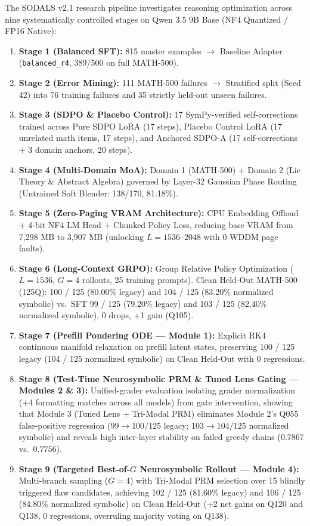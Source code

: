 \documentclass[11pt,a4paper]{article}
\begin{document}
The SODALS v2.1 research pipeline investigates reasoning optimization across nine systematically controlled stages on Qwen 3.5 9B Base (NF4 Quantized / FP16 Native):
\begin{enumerate}
    \item \textbf{Stage 1 (Balanced SFT):} 815 master examples $\to$ Baseline Adapter (\texttt{balanced\_r4}, 389/500 on full MATH-500).
    \item \textbf{Stage 2 (Error Mining):} 111 MATH-500 failures $\to$ Stratified split (Seed 42) into 76 training failures and 35 strictly held-out unseen failures.
    \item \textbf{Stage 3 (SDPO \& Placebo Control):} 17 SymPy-verified self-corrections trained across Pure SDPO LoRA (17 steps), Placebo Control LoRA (17 unrelated math items, 17 steps), and Anchored SDPO-A (17 self-corrections + 3 domain anchors, 20 steps).
    \item \textbf{Stage 4 (Multi-Domain MoA):} Domain 1 (MATH-500) + Domain 2 (Lie Theory \& Abstract Algebra) governed by Layer-32 Gaussian Phase Routing (Untrained Soft Blender: 138/170, 81.18\%).
    \item \textbf{Stage 5 (Zero-Paging VRAM Architecture):} CPU Embedding Offload + 4-bit NF4 LM Head + Chunked Policy Loss, reducing base VRAM from 7,298 MB to 3,907 MB (unlocking $L=1536\text{--}2048$ with 0 WDDM page faults).
    \item \textbf{Stage 6 (Long-Context GRPO):} Group Relative Policy Optimization ($L=1536$, $G=4$ rollouts, 25 training prompts). Clean Held-Out MATH-500 (125Q): 100 / 125 (80.00\% legacy) and 104 / 125 (83.20\% normalized symbolic) vs.\ SFT 99 / 125 (79.20\% legacy) and 103 / 125 (82.40\% normalized symbolic), 0 drops, +1 gain (Q105).
    \item \textbf{Stage 7 (Prefill Pondering ODE --- Module 1):} Explicit RK4 continuous manifold relaxation on prefill latent states, preserving 100 / 125 legacy (104 / 125 normalized symbolic) on Clean Held-Out with 0 regressions.
    \item \textbf{Stage 8 (Test-Time Neurosymbolic PRM \& Tuned Lens Gating --- Modules 2 \& 3):} Unified-grader evaluation isolating grader normalization (+4 formatting matches across all models) from gate intervention, showing that Module 3 (Tuned Lens + Tri-Modal PRM) eliminates Module 2's Q055 false-positive regression ($99 \to 100/125$ legacy; $103 \to 104/125$ normalized symbolic) and reveals high inter-layer stability on failed greedy chains ($0.7867$ vs.\ $0.7756$).
    \item \textbf{Stage 9 (Targeted Best-of-$G$ Neurosymbolic Rollout --- Module 4):} Multi-branch sampling ($G=4$) with Tri-Modal PRM selection over 15 blindly triggered flaw candidates, achieving 102 / 125 (81.60\% legacy) and 106 / 125 (84.80\% normalized symbolic) on Clean Held-Out (+2 net gains on Q120 and Q138, 0 regressions, overruling majority voting on Q138).
\end{enumerate}
\end{document}
